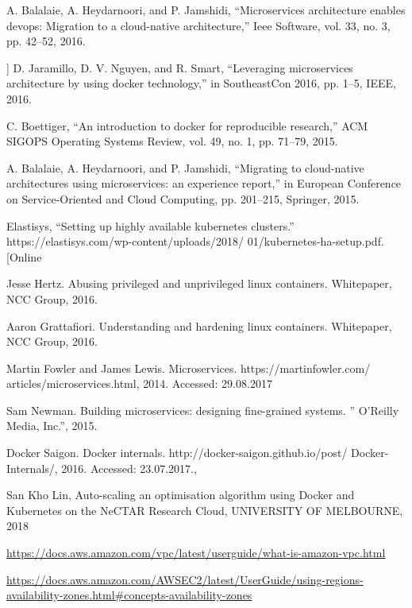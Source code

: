 \documentclass[thesis=M,czech]{FITthesis}[2019/12/23]
\theoremstyle{plain}
\theoremstyle{definition}
\begin{document}
\begin{thebibliography}{9}

A. Balalaie, A. Heydarnoori, and P. Jamshidi, “Microservices architecture enables devops: Migration to a cloud-native architecture,” Ieee Software, vol. 33, no. 3, pp. 42–52, 2016.



] D. Jaramillo, D. V. Nguyen, and R. Smart, “Leveraging microservices architecture by using docker technology,” in SoutheastCon 2016, pp. 1–5, IEEE,
2016.


C. Boettiger, “An introduction to docker for reproducible research,” ACM
SIGOPS Operating Systems Review, vol. 49, no. 1, pp. 71–79, 2015.


	A. Balalaie, A. Heydarnoori, and P. Jamshidi, “Migrating to cloud-native
architectures using microservices: an experience report,” in European Conference on Service-Oriented and Cloud Computing, pp. 201–215, Springer,
2015.



Elastisys, “Setting up highly available kubernetes clusters.”
https://elastisys.com/wp-content/uploads/2018/
01/kubernetes-ha-setup.pdf. [Online



	Jesse Hertz. Abusing privileged and unprivileged linux containers. Whitepaper,
	NCC Group, 2016.


	Aaron Grattafiori. Understanding and hardening linux containers. Whitepaper,
NCC Group, 2016.


Martin Fowler and James Lewis. Microservices. https://martinfowler.com/
articles/microservices.html, 2014. Accessed: 29.08.2017


Sam Newman. Building microservices: designing fine-grained systems. ” O’Reilly
Media, Inc.”, 2015.


Docker Saigon. Docker internals. http://docker-saigon.github.io/post/
Docker-Internals/, 2016. Accessed: 23.07.2017., 



San Kho Lin, Auto-scaling an optimisation algorithm using Docker and Kubernetes on the NeCTAR Research Cloud, UNIVERSITY OF MELBOURNE, 2018




\url{https://docs.aws.amazon.com/vpc/latest/userguide/what-is-amazon-vpc.html
}


\url{https://docs.aws.amazon.com/AWSEC2/latest/UserGuide/using-regions-availability-zones.html#concepts-availability-zones
}
\end{thebibliography}
\end{document}
